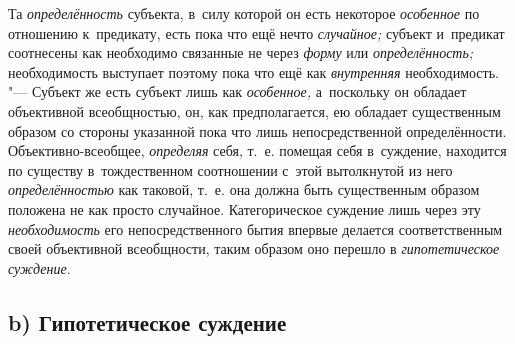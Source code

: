 Та {\em определённость} субъекта, в~силу которой он есть некоторое
{\em особенное} по отношению к~предикату, есть пока что ещё нечто
{\em случайное;} субъект и~предикат соотнесены как необходимо связанные
не через {\em форму} или {\em определённость;}
необходимость выступает поэтому пока что ещё как
{\em внутренняя} необходимость. "--- Субъект же есть субъект лишь
как {\em особенное,} а~поскольку он обладает объективной всеобщностью,
он, как предполагается, ею
обладает существенным образом со стороны указанной пока что лишь
непосредственной определённости. Объективно-всеобщее, {\em определяя} себя,
т.~е. помещая себя в~суждение, находится по существу в~тождественном
соотношении с~этой вытолкнутой из него {\em определённостью} как
таковой, т.~е. она должна быть существенным образом положена не как просто
случайное. Категорическое суждение лишь через эту {\em необходимость} его
непосредственного бытия впервые делается соответственным своей объективной
всеобщности, таким образом оно перешло в {\em гипотетическое суждение}.

\subsection[b) Гипотетическое суждение]{b) Гипотетическое суждение}

